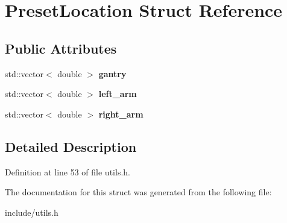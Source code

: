 \hypertarget{structPresetLocation}{}\section{Preset\+Location Struct Reference}
\label{structPresetLocation}
\subsection*{Public Attributes}
\begin{DoxyCompactItemize}
\item 
\mbox{\label{structPresetLocation_a2e72ec837bd480d52c8588647216e51e}} 
std\+::vector$<$ double $>$ {\bfseries gantry}
\item 
\mbox{\label{structPresetLocation_af4ec647a46d50b9bdc9b73e9cc243efe}} 
std\+::vector$<$ double $>$ {\bfseries left\+\_\+arm}
\item 
\mbox{\label{structPresetLocation_a30f904f7e057787cf6c4be39407b571d}} 
std\+::vector$<$ double $>$ {\bfseries right\+\_\+arm}
\end{DoxyCompactItemize}


\subsection{Detailed Description}


Definition at line 53 of file utils.\+h.



The documentation for this struct was generated from the following file\+:\begin{DoxyCompactItemize}
\item 
include/utils.\+h\end{DoxyCompactItemize}
